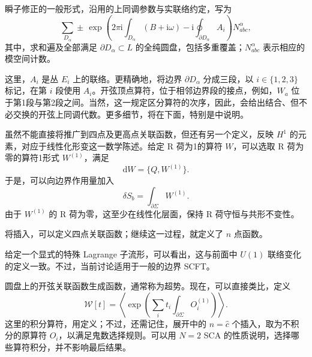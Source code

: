 瞬子修正的一般形式，沿用的上同调参数与实联络约定，写为
\begin{equation}\label{eq:3.177}
\sum_{D_\alpha}\pm\,
\exp\left(2\pi\mathrm{i}\int_{D_\alpha}(B+\mathrm{i}\omega)
-\mathrm{i}\oint_{\partial D_\alpha}A_i\right)
N_{abc}^{\alpha},
\end{equation}
其中，求和遍及全部满足 $\partial D_\alpha\subset L$ 的全纯圆盘，包括多重覆盖；$N_{abc}^{\alpha}$ 表示相应的模空间计数。

这里，$A_i$ 是丛 $E_i$ 上的联络。更精确地，将边界 $\partial D_\alpha$ 分成三段，以 $i\in\{1,2,3\}$ 标记，在第 $i$ 段使用 $A_i$。开弦顶点算符，位于相邻边界段的接点，例如，$W_a$ 位于第1段与第2段之间。当然，这一规定区分算符的次序，因此，会给出结合、但不必交换的开弦上同调代数。更多细节，将在下面，特别是中说明。

虽然不能直接将推广到四点及更高点关联函数，但还有另一个定义，反映 $H^1$ 的元素，对应于线性化形变这一数学陈述。给定 R 荷为1的算符 $W$，可以选取 R 荷为零的算符1形式 $W^{(1)}$，满足
\begin{equation}\label{eq:3.178}
\mathrm{d}W=\{Q,W^{(1)}\}.
\end{equation}
于是，可以向边界作用量加入
\begin{equation}\label{eq:3.179}
\delta S_b=\int_{\partial\Sigma}W^{(1)}.
\end{equation}
由于 $W^{(1)}$ 的 R 荷为零，这至少在线性化层面，保持 R 荷守恒与共形不变性。

将插入，可以定义四点关联函数；继续这一过程，就定义了 $n$ 点函数。

给定一个显式的特殊 Lagrange 子流形，可以看出，这与前面中 $U(1)$ 联络变化的定义一致。不过，当前讨论适用于一般的边界 SCFT。

圆盘上的开弦关联函数生成函数，通常称为超势。现在，可以直接类比，定义
\begin{equation}\label{eq:3.180}
\mathcal{W}[t]=\left\langle
\exp\left(\sum_i t_i\int_{\partial\Sigma}O_i^{(1)}\right)
\right\rangle.
\end{equation}
这里的积分算符，用定义；不过，还需记住，展开中的 $n=\widehat c$ 个插入，取为不积分的原算符 $O_i$，以满足鬼数选择规则。可以用 $N=2$ SCA 的性质说明，选择哪些算符积分，并不影响最后结果。


